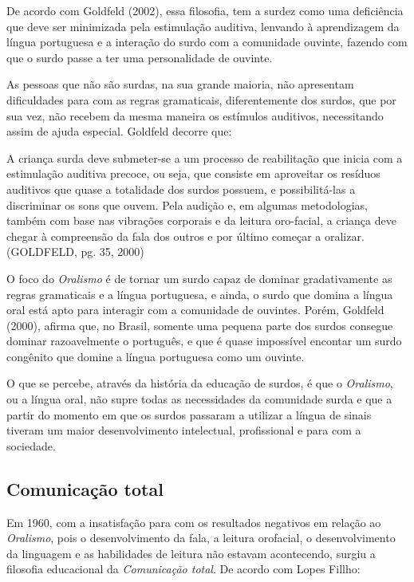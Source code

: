 \documentclass[brasil]{abnt}
\begin{document}
		 De acordo com Goldfeld (2002), essa filosofia, tem a surdez como uma deficiência que deve ser minimizada pela estimulação auditiva, lenvando à aprendizagem da língua portuguesa e a interação do surdo com a comunidade
		 ouvinte, fazendo com que o surdo passe a ter uma personalidade de ouvinte.  
		 
		 As pessoas que não são surdas, na sua grande maioria, não apresentam dificuldades para com as regras gramaticais, diferentemente dos surdos, que por sua vez, não recebem da mesma maneira os estímulos auditivos, necessitando
		 assim de ajuda especial. Goldfeld decorre que:
		 
			\begin{citacao} A criança surda deve submeter-se a um processo de reabilitação que inicia com a estimulação auditiva precoce, ou seja, que consiste em aproveitar os resíduos auditivos que quase a totalidade dos surdos 
							possuem, e possibilitá-las a discriminar os sons que ouvem. Pela audição e, em algumas metodologias, também com base nas vibrações corporais e da leitura oro-facial, a criança deve chegar à compreensão 
							da fala dos outros e por último começar a oralizar. (GOLDFELD, pg. 35, 2000) 
			\end{citacao}
		
		O foco do \textit{Oralismo} é de tornar um surdo capaz de dominar gradativamente as regras gramaticais e a língua portuguesa, e ainda, o surdo que domina a língua oral está apto para interagir com a comunidade de ouvintes. Porém,
		Goldfeld (2000), afirma que, no Brasil, somente uma pequena parte dos surdos consegue dominar razoavelmente o português, e que é quase impossível encontar um surdo congênito que domine a língua portuguesa como um ouvinte.
		
		O que se percebe, através da história da educação de surdos, é que o \textit{Oralismo}, ou a língua oral, não supre todas as necessidades da comunidade surda e que a partir do momento em que os surdos passaram a utilizar a língua de sinais 
		tiveram um maior desenvolvimento intelectual, profissional e para com a sociedade.		 		 
		 
		\subsection{Comunicação total}
		Em 1960, com a insatisfação para com os resultados negativos em relação ao \textit{Oralismo}, pois o desenvolvimento da fala, a leitura orofacial, o desenvolvimento da linguagem e as habilidades de leitura não estavam acontecendo, 
		surgiu a filosofia educacional da \textit{Comunicação total}. De acordo com Lopes Fillho:
		
\end{document}
